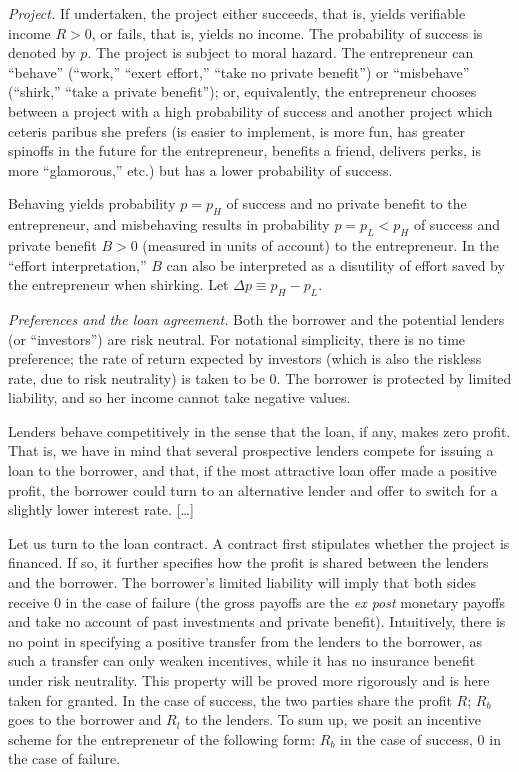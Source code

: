\documentclass[11pt,a4paper]{article}
\begin{document}
\emph{Project.} If undertaken, the project either succeeds, that is, yields verifiable income
\(R > 0\), or fails, that is, yields no income. The probability of success is denoted by \(p\). The
project is subject to moral hazard. The entrepreneur can ``behave'' (``work,'' ``exert effort,''
``take no private benefit'') or ``misbehave'' (``shirk,'' ``take a private benefit''); or,
equivalently, the entrepreneur chooses between a project with a high probability of success and
another project which ceteris paribus she prefers (is easier to implement, is more fun, has greater
spinoffs in the future for the entrepreneur, benefits a friend, delivers perks, is more
``glamorous,'' etc.) but has a lower probability of success.

Behaving yields probability \(p = p_H\) of success and no private benefit to the entrepreneur, and
misbehaving results in probability \(p = p_L < p_H\) of success and private benefit \(B > 0\)
(measured in units of account) to the entrepreneur. In the ``effort interpretation,'' \(B\) can also
be interpreted as a disutility of effort saved by the entrepreneur when shirking. Let
\(\Delta p \equiv p_H - p_L\).

\emph{Preferences and the loan agreement.} Both the borrower and the potential lenders (or
``investors'') are risk neutral. For notational simplicity, there is no time preference; the rate of
return expected by investors (which is also the riskless rate, due to risk neutrality) is taken to
be 0. The borrower is protected by limited liability, and so her income cannot take negative values.

Lenders behave competitively in the sense that the loan, if any, makes zero profit. That is, we have
in mind that several prospective lenders compete for issuing a loan to the borrower, and that, if
the most attractive loan offer made a positive profit, the borrower could turn to an alternative
lender and offer to switch for a slightly lower interest rate. {[}\ldots{]}

Let us turn to the loan contract. A contract first stipulates whether the project is financed. If
so, it further specifies how the profit is shared between the lenders and the borrower. The
borrower's limited liability will imply that both sides receive 0 in the case of failure (the gross
payoffs are the \emph{ex post} monetary payoffs and take no account of past investments and private
benefit). Intuitively, there is no point in specifying a positive transfer from the lenders to the
borrower, as such a transfer can only weaken incentives, while it has no insurance benefit under
risk neutrality. This property will be proved more rigorously and is here taken for granted. In the
case of success, the two parties share the profit \(R\); \(R_b\) goes to the borrower and \(R_l\) to
the lenders. To sum up, we posit an incentive scheme for the entrepreneur of the following form:
\(R_b\) in the case of success, 0 in the case of failure.
\end{document}
